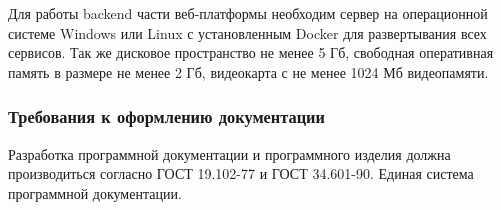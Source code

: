 Для работы backend части веб-платформы необходим сервер на операционной системе Windows или Linux с установленным Docker для развертывания всех сервисов. Так же дисковое пространство не менее 5 Гб, свободная оперативная память в размере не менее 2 Гб, видеокарта с не менее 1024 Мб видеопамяти.

\subsubsection{Требования к оформлению документации}

Разработка программной документации и программного изделия должна производиться согласно ГОСТ 19.102-77 и ГОСТ 34.601-90. Единая система программной документации.
